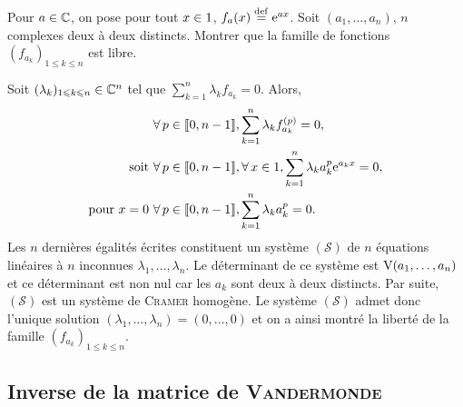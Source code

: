 \begin{exercice}
    Pour $a \in \mathbb{C}$, on pose pour tout $x \in 1$, $f_a(x) \overset{\mathrm{\tiny def}}{=} \mathrm{e}^{ax}$. Soit $(a_1, \dots, a_n)$, $n$ complexes deux à deux distincts. Montrer que la famille de fonctions $(f_{a_k})_{1 \leqslant k \leqslant n}$ est libre.
\end{exercice}

\begin{solution}
    \item Soit $(\lambda_k)_{1 \leqslant k \leqslant n} \in \mathbb{C}^n$ tel que $\sum\limits_{k=1}^n \lambda_k f_{a_k} = 0$. Alors, 
    \begin{align*}
        & \forall p \in \llbracket 0, n-1 \rrbracket, \sum_{k=1}^n \lambda_k f^{(p)}_{a_k} = 0, \\
        \text{soit } & \forall p \in \llbracket 0, n-1 \rrbracket, \forall x \in \R, \sum_{k=1}^n \lambda_k a_k^p \e^{a_k x} = 0, \\
        \text{pour $x=0$ } & \forall p \in \llbracket 0, n-1 \rrbracket, \sum_{k=1}^n \lambda_k a_k^p = 0.
    \end{align*}
    Les $n$ dernières égalités écrites constituent un système $(\mathscr{S})$ de $n$ équations linéaires à $n$ inconnues $\lambda_1, \dots, \lambda_n$. Le déterminant de ce système est $\mathrm{V}(a_1, \dots, a_n)$ et ce déterminant est non nul car les $a_k$ sont deux à deux distincts. Par suite, $(\mathscr{S})$ est un système de \textsc{Cramer} homogène. Le système $(\mathscr{S})$ admet donc l'unique solution $(\lambda_1, \dots, \lambda_n) = (0, \dots, 0)$ et on a ainsi montré la liberté de la famille $(f_{a_k})_{1 \leqslant k \leqslant n}$.
\end{solution}

\subsection{Inverse de la matrice de {\textsc{Vandermonde}}}

